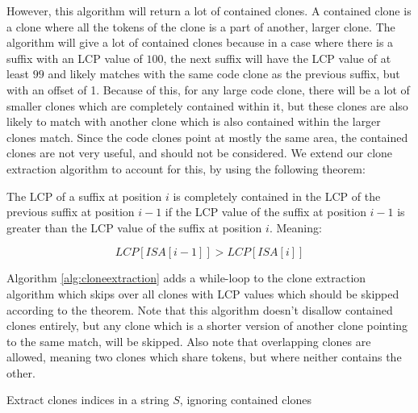 However, this algorithm will return a lot of contained clones. A contained clone is a
clone where all the tokens of the clone is a part of another, larger clone. The algorithm
will give a lot of contained clones because in a case where there is a suffix with an LCP
value of $100$, the next suffix will have the LCP value of at least $99$ and likely
matches with the same code clone as the previous suffix, but with an offset of 1. Because
of this, for any large code clone, there will be a lot of smaller clones which are
completely contained within it, but these clones are also likely to match with another
clone which is also contained within the larger clones match. Since the code clones point
at mostly the same area, the contained clones are not very useful, and should not be
considered. We extend our clone extraction algorithm to account for this, by using the
following theorem:

\begin{theorem} 

    The LCP of a suffix at position $i$ is completely contained in the LCP of the previous
    suffix at position $i - 1$ if the LCP value of the suffix at position $i - 1$ is
    greater than the LCP value of the suffix at position $i$. Meaning:

    $$
    LCP[ISA[i - 1]] > LCP[ISA[i]]
    $$

\end{theorem}


Algorithm \ref{alg:cloneextraction} adds a while-loop to the clone extraction algorithm
which skips over all clones with LCP values which should be skipped according to the
theorem. Note that this algorithm doesn't disallow contained clones entirely, but any
clone which is a shorter version of another clone pointing to the same match, will be
skipped. Also note that overlapping clones are allowed, meaning two clones which share
tokens, but where neither contains the other.

\begin{algorithm}[htp!]
  \SetAlgoLined\DontPrintSemicolon

  \vspace{0.5cm}
  \caption{Extract clones indices in a string $S$, ignoring contained clones}
  \label{alg:cloneextraction}
\end{algorithm}

